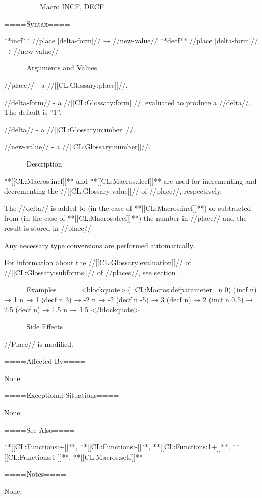 ====== Macro INCF, DECF ======

====Syntax====

**incf** //place [delta-form]// → //new-value// **decf** //place [delta-form]// → //new-value//

====Arguments and Values====

//place// - a //[[CL:Glossary:place]]//.

//delta-form// - a //[[CL:Glossary:form]]//; evaluated to produce a //delta//. The default is ''1''.

//delta// - a //[[CL:Glossary:number]]//.

//new-value// - a //[[CL:Glossary:number]]//.

====Description====

**[[CL:Macros:incf]]** and **[[CL:Macros:decf]]** are used for incrementing and decrementing the //[[CL:Glossary:value]]// of //place//, respectively.

The //delta// is added to (in the case of **[[CL:Macros:incf]]**) or subtracted from (in the case of **[[CL:Macros:decf]]**) the number in //place// and the result is stored in //place//.

Any necessary type conversions are performed automatically.

For information about the //[[CL:Glossary:evaluation]]// of //[[CL:Glossary:subforms]]// of //places//, see section {\secref\GenRefSubFormEval}.

====Examples==== <blockquote> ([[CL:Macros:defparameter]] n 0) (incf n) → 1 n → 1 (decf n 3) → -2 n → -2 (decf n -5) → 3 (decf n) → 2 (incf n 0.5) → 2.5 (decf n) → 1.5 n → 1.5 </blockquote>

====Side Effects====

//Place// is modified.

====Affected By====

None.

====Exceptional Situations====

None.

====See Also====

**[[CL:Functions:+]]**, **[[CL:Functions:-]]**, **[[CL:Functions:1+]]**, **[[CL:Functions:1-]]**, **[[CL:Macros:setf]]**

====Notes====

None.



